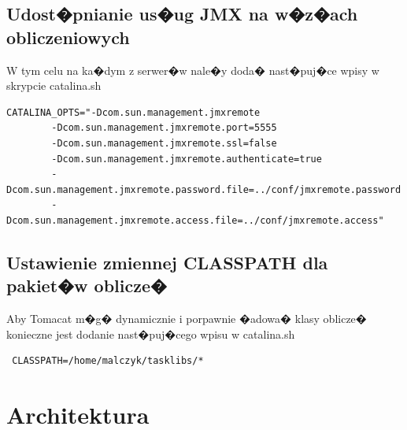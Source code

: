 \documentclass{article}
\begin{document}
\subsection{Udost�pnianie us�ug JMX na w�z�ach obliczeniowych}
W tym celu na ka�dym z serwer�w nale�y doda� nast�puj�ce wpisy w skrypcie catalina.sh
{\tiny
\begin{verbatim}
CATALINA_OPTS="-Dcom.sun.management.jmxremote
        -Dcom.sun.management.jmxremote.port=5555
        -Dcom.sun.management.jmxremote.ssl=false
        -Dcom.sun.management.jmxremote.authenticate=true
        -Dcom.sun.management.jmxremote.password.file=../conf/jmxremote.password
        -Dcom.sun.management.jmxremote.access.file=../conf/jmxremote.access"
\end{verbatim}
}

\subsection{Ustawienie zmiennej CLASSPATH dla pakiet�w oblicze�}
Aby Tomacat m�g� dynamicznie i porpawnie �adowa� klasy oblicze� konieczne jest dodanie nast�puj�cego wpisu w catalina.sh
\begin{verbatim}
 CLASSPATH=/home/malczyk/tasklibs/*
\end{verbatim}

\section{Architektura}
\end{document}
